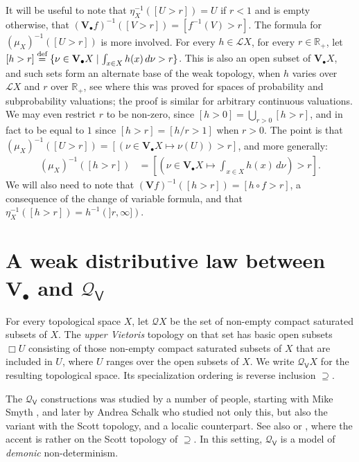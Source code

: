 \documentclass[preprint,12pt]{elsarticle}
\newcommand\eqdef{\mathrel{\buildrel \text{def}\over=}}
\newcommand{\Rp}{\mathbb{R}_+}
\newcommand\Lform{\mathcal L}
\newcommand\Smyth{{\mathcal Q}}
\newcommand\Vt{\mathsf{V}}
\newcommand\SV{\Smyth_{\Vt}}
\newcommand\Val{{\mathbf V}}
\begin{document}
It will be useful to note that $\eta_X^{-1} ([U > r]) = U$ if $r < 1$
and is empty otherwise, that
${(\Val_\bullet f)}^{-1} ([V > r]) = [f^{-1} (V) > r]$.  The formula
for ${(\mu_X)}^{-1} ([U > r])$ is more involved.  For every
$h \in \Lform X$, for every $r \in \Rp$, let
$[h > r] \eqdef \{\nu \in \Val_\bullet X \mid \int_{x \in X} h (x)
\,d\nu > r\}$.  This is also an open subset of $\Val_\bullet X$, and
such sets form an alternate base of the weak topology, when $h$ varies
over $\Lform X$ and $r$ over $\Rp$, see
\cite[Theorem~3.3]{Jung:scs:prob} where this was proved for spaces of
probability and subprobability valuations; the proof is similar for
arbitrary continuous valuations.  We may even restrict $r$ to be
non-zero, since $[h > 0] = \bigcup_{r > 0} [h > r]$, and in fact to be
equal to $1$ since $[h > r] = [h/r > 1]$ when $r > 0$.  The point is
that
${(\mu_X)}^{-1} ([U > r]) = [(\nu \in \Val_\bullet X \mapsto \nu (U))
> r]$, and more generally:
\begin{align}
  \label{eq:mu-1}
  {(\mu_X)}^{-1} ([h > r])
  & = \left[\left(\nu \in \Val_\bullet X \mapsto \int_{x \in X} h (x) \,d\nu\right) > r\right].
\end{align}
We will also need to note that
${(\Val f)}^{-1} ([h > r]) = [h \circ f > r]$, a consequence of the
change of variable formula, and that
$\eta_X^{-1} ([h > r]) = h^{-1} (]r, \infty])$.

\part{A weak distributive law between $\Val_\bullet$ and $\SV$}

For every topological space $X$, let $\Smyth X$ be the set of
non-empty compact saturated subsets of $X$.  The \emph{upper Vietoris}
topology on that set has basic open subsets $\Box U$ consisting of
those non-empty compact saturated subsets of $X$ that are included in
$U$, where $U$ ranges over the open subsets of $X$.  We write $\SV X$
for the resulting topological space.  Its specialization ordering is
reverse inclusion $\supseteq$.

The $\SV$ constructions was studied by a number of people, starting
with Mike Smyth \cite{Smyth:power:pred}, and later by Andrea Schalk
\cite[Section~7]{schalk:diss} who studied not only this, but also the
variant with the Scott topology, and a localic counterpart.  See also
\cite[Sections~6.2.2, 6.2.3]{AJ:domains} or
\cite[Section~IV-8]{GHKLMS:contlatt}, where the accent is rather on
the Scott topology of $\supseteq$.  In this setting, $\SV$ is a model
of \emph{demonic} non-determinism.
\end{document}
